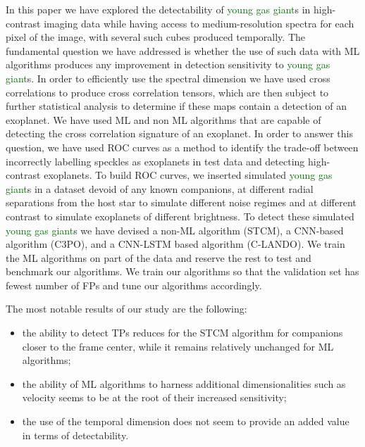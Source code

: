 \documentclass{aa}
\newcommand{\newchange}[1]{\textcolor{darkgreen}{#1}}
\begin{document}
In this paper we have explored the detectability of \newchange{young gas giant}s in high-contrast imaging data while having access to medium-resolution spectra for each pixel of the image, with several such cubes produced temporally.
The fundamental question we have addressed is whether the use of such data with ML algorithms produces any improvement in detection sensitivity to \newchange{young gas giant}s.
In order to efficiently use the spectral dimension we have used cross correlations to produce cross correlation tensors, which are then subject to further statistical analysis to determine if these maps contain a detection of an exoplanet.
We have used ML and non ML algorithms that are capable of detecting the cross correlation signature of an exoplanet. %
In order to answer this question, we have used ROC curves as a method to identify the trade-off between incorrectly labelling speckles as exoplanets in test data and detecting high-contrast exoplanets.
To build ROC curves, we inserted simulated \newchange{young gas giant}s in a dataset devoid of any known companions, at different radial separations from the host star to simulate different noise regimes and at different contrast to simulate exoplanets of different brightness.
To detect these simulated \newchange{young gas giant}s we have devised a non-ML algorithm (STCM), a CNN-based algorithm (C3PO), and a CNN-LSTM based algorithm (C-LANDO). 
We train the ML algorithms on part of the data and reserve the rest to test and benchmark our algorithms. 
We train our algorithms so that the validation set has fewest number of FPs and tune our algorithms accordingly. 

The most notable results of our study are the following:
\begin{itemize}
    \item the ability to detect TPs reduces for the STCM algorithm for companions closer to the frame center, while it remains relatively unchanged for ML algorithms;
    \item the ability of ML algorithms to harness additional dimensionalities such as velocity seems to be at the root of their increased sensitivity;
    \item the use of the temporal dimension does not seem to provide an added value in terms of detectability.%
\end{itemize}
\end{document}

